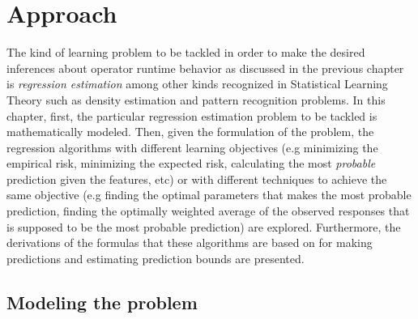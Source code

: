 
\chapter{Approach} %

\label{Chapter4} %


The kind of learning problem to be tackled in order to make the desired inferences about operator runtime behavior as discussed in the previous chapter is \textit{regression estimation} among other kinds recognized in Statistical Learning Theory such as density estimation and pattern recognition problems. In this chapter, first, the particular regression estimation problem to be tackled is mathematically modeled. Then, given the formulation of the problem, the regression algorithms with different learning objectives (e.g minimizing the empirical risk, minimizing the expected risk, calculating the most \textit{probable} prediction given the features, etc) or with different techniques to achieve the same objective (e.g finding the optimal parameters that makes the most probable prediction, finding the optimally weighted average of the observed responses that is supposed to be the most probable prediction) are explored. Furthermore, the derivations of the formulas that these algorithms are based on for making predictions and estimating prediction bounds are presented.

\section{Modeling the problem}

